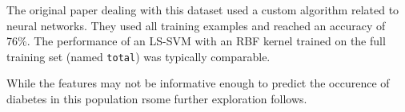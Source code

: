 \par The original paper dealing with this dataset used a custom algorithm related to neural networks. They used all training examples and reached an accuracy of 76\%. The performance of an LS-SVM with an RBF kernel trained on the full training set (named \texttt{total}) was typically comparable.

\par While the features may not be informative enough to predict the occurence of diabetes in this population rsome further exploration follows.


%

